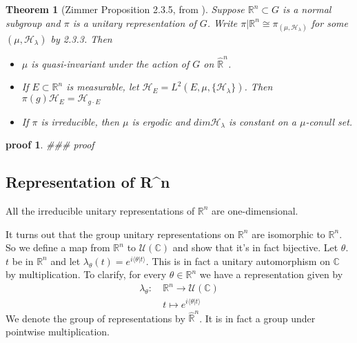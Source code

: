 \documentclass[
]{article}
\newtheorem{thm}{Theorem}
\newtheorem{pf}{proof}
\begin{document}
\begin{thm}[Zimmer Proposition 2.3.5, from \cite{mackey76}]
   
Suppose \(\mathbb{R}^n \subset G\) is a normal subgroup and \(\pi\) is a unitary representation of \(G\).
Write \(\pi | \mathbb{R}^n \cong \pi_{(\mu, \mathscr{H}_{\lambda})}\) for some
\((\mu, \mathscr{H}_{\lambda})\) by 2.3.3. Then  
  \begin{itemize}
    \item \(\mu\) is quasi-invariant under the action of \(G\) on \(\hat{\mathbb{R}}^n\). 
    \item If \(E \subset \mathbb{R}^n\) is measurable, let
      \(\mathscr{H}_E = L^2(E, \mu, \{\mathscr{H}_{\lambda}\})\).
      Then \(\pi(g)\mathscr{H}_E = \mathscr{H}_{g \cdot E}\)
    \item If \(\pi\) is irreducible, then \(\mu\) is ergodic and \(dim\mathscr{H}_{\lambda}\) is
      constant on a \(\mu\)-conull set.
  \end{itemize}
\end{thm}

\begin{pf}
   \#\#\# proof 
\end{pf}


\hypertarget{representation-of-rn}{%
\subsection{Representation of R\^{}n}\label{representation-of-rn}}


All the irreducible unitary
representations of \(\mathbb{R}^n\) are one-dimensional.

It turns out that the group unitary representations on \(\mathbb{R}^n\)
are isomorphic to \(\mathbb{R}^n\). So we define a map from
\(\mathbb{R}^n\) to \(\mathcal{U}(\mathbb{C})\) and show that it's in
fact bijective. Let \(\theta\). \(t\) be in \(\mathbb{R}^n\) and let
\(\lambda_{\theta}(t) = e^{i\langle \theta | t \rangle}\). This is in
fact a unitary automorphism on \(\mathbb{C}\) by multiplication. To
clarify, for every \(\theta \in \mathbb{R}^n\) we have a representation
given by
  \begin{align*}
  \lambda_{\theta}:\ & \mathbb{R}^n \rightarrow \mathcal{U}(\mathbb{C}) \\
  & t \mapsto e^{i \langle \theta | t \rangle}
  \end{align*}
We denote the group of representations by \(\hat{\mathbb{R}}^n\). It
is in fact a group under pointwise multiplication.
\end{document}
